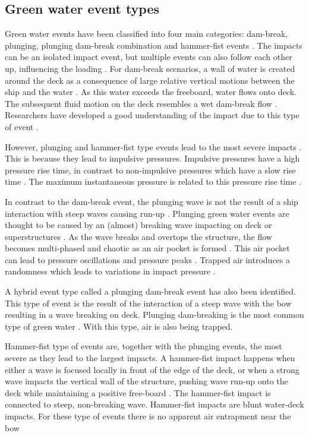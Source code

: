 \subsection{Green water event types}
\label{sec:lit_event_types}
Green water events have been classified into four main categories: dam-break, plunging, plunging dam-break combination and hammer-fist events \cite{Greco2007,Chuang2019,Zhang2019}. The impacts can be an isolated impact event, but multiple events can also follow each other up, influencing the loading \cite{Kendon2010}.  For dam-break scenarios, a wall of water is created around the deck as a consequence of large relative vertical motions between the ship and the water \cite{Buchner2002}. As this water exceeds the freeboard, water flows onto deck. The subsequent fluid motion on the deck resembles a wet dam-break flow \cite{Faltinsen2002}.  Researchers have developed a good understanding of the impact due to this type of event \cite{Ariyarathne2012}. 
\par 
However, plunging and hammer-fist type events lead to the most severe impacts \cite{Greco2007}. This is because they lead to impulsive pressures. Impulsive pressures have a high pressure rise time, in contrast to non-impulsive pressures which have a slow rise time \cite{Chuang2019}. The maximum instantaneous pressure is related to this pressure rise time \cite{Song2015}. 
\par 
In contrast to the dam-break event, the plunging wave is not the result of a ship interaction with steep waves causing run-up \cite{Chuang2019,Faltinsen2002}. Plunging green water events are thought to be caused by an (almost) breaking wave impacting on deck or superstructures \cite{Faltinsen2002}. As the wave breaks and overtops the structure, the flow becomes multi-phased and chaotic as an air pocket is formed \cite{Temarel2016}. This air pocket can lead to pressure oscillations and pressure peaks \cite{Lee2020}. Trapped air introduces a randomness which leads to variations in impact pressure \cite{Ariyarathne2012}. 
\par
A hybrid event type called a plunging dam-break event has also been identified. This type of event is the result of the interaction of a steep wave with the bow resulting in a wave breaking on deck. 
Plunging dam-breaking is the most common type of green water \cite{Greco2007, Greco2012}. With this type, air is also being trapped.  \par 
Hammer-fist type of events are, together with the plunging events, the most severe as they lead to the largest impacts. A hammer-fist impact happens when either a wave is focused locally in front of the edge of the deck, or when a strong wave impacts the vertical wall of the structure, pushing wave run-up onto the deck while maintaining a positive free-board \cite{Chuang2019}. The hammer-fist impact is connected to steep, non-breaking wave. Hammer-fist impacts are blunt water-deck impacts. For these type of events there is no apparent air entrapment near the bow \cite{Greco2007} 
